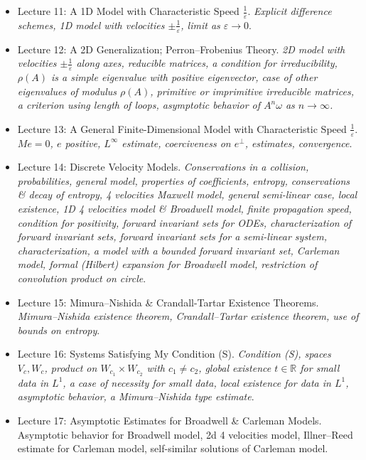 \documentclass{article}
\begin{document}
\begin{enumerate}
\begin{itemize}
		\item {\sf Lecture 11: A 1D Model with Characteristic Speed $\frac{1}{\varepsilon}$.} {\it Explicit difference schemes, 1D model with velocities $\pm\frac{1}{\varepsilon}$, limit as $\varepsilon\to0$}.
		
		\item {\sf Lecture 12: A 2D Generalization; Perron--Frobenius Theory.} {\it2D model with velocities $\pm\frac{1}{\varepsilon}$ along axes, reducible matrices, a condition for irreducibility, $\rho(A)$ is a simple eigenvalue with positive eigenvector, case of other eigenvalues of modulus $\rho(A)$, primitive or imprimitive irreducible matrices, a criterion using length of loops, asymptotic behavior of $A^n\omega$ as $n\to\infty$.}
		
		\item {\sf Lecture 13: A General Finite-Dimensional Model with Characteristic Speed $\frac{1}{\varepsilon}$.} {\it $Me = 0$, $e$ positive, $L^\infty$ estimate, coerciveness on $e^\bot$, estimates, convergence}.
		
		\item {\sf Lecture 14: Discrete Velocity Models.} {\it Conservations in a collision, probabilities, general model, properties of coefficients, entropy, conservations \& decay of entropy, 4 velocities Maxwell model, general semi-linear case, local existence, 1D 4 velocities model \& Broadwell model, finite propagation speed, condition for positivity, forward invariant sets for ODEs, characterization of forward invariant sets, forward invariant sets for a semi-linear system, characterization, a model with a bounded forward invariant set, Carleman model, formal (Hilbert) expansion for Broadwell model, restriction of convolution product on circle}.
		
		\item {\sf Lecture 15: Mimura--Nishida \& Crandall-Tartar Existence Theorems.} {\it Mimura--Nishida existence theorem, Crandall--Tartar existence theorem, use of bounds on entropy}.
		
		\item {\sf Lecture 16: Systems Satisfying My Condition (S).} {\it Condition (S), spaces $V_c,W_c$, product on $W_{c_1}\times W_{c_2}$ with $c_1\ne c_2$, global existence $t\in\mathbb{R}$ for small data in $L^1$, a case of necessity for small data, local existence for data in $L^1$, asymptotic behavior, a Mimura--Nishida type estimate}.
		
		\item {\sf Lecture 17: Asymptotic Estimates for Broadwell \& Carleman Models.} Asymptotic behavior for Broadwell model, 2d 4 velocities model, Illner--Reed estimate for Carleman model, self-similar solutions of Carleman model.
		

\end{itemize}
\end{enumerate}
\end{document}
